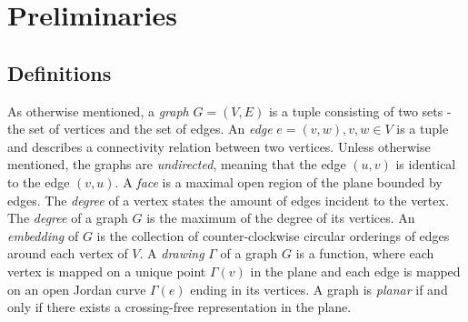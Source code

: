 \section{Preliminaries}
\subsection{Definitions}
As otherwise mentioned, a \textit{graph} $G=(V,E)$ is a tuple consisting of two sets - the set of vertices and the set of edges. An \textit{edge} $e = (v,w), v,w \in V$ is a tuple and describes a connectivity relation between two vertices. Unless otherwise mentioned, the graphs are \textit{undirected}, meaning that the edge $(u,v)$ is identical to the edge $(v,u)$. 
A \textit{face} is a maximal open region of the plane bounded by edges. 
The \textit{degree} of a vertex states the amount of edges incident to the vertex. The \textit{degree} of a graph $G$ is the maximum of the degree of its vertices. 
An \textit{embedding} of $G$ is the collection of counter-clockwise circular orderings of edges around each vertex of $V$.
A \textit{drawing} $\Gamma$ of a graph $G$ is a function, where each vertex is mapped on a unique point $\Gamma(v)$ in the plane and each edge is mapped on an open Jordan curve $\Gamma(e)$ ending in its vertices. 
A graph is \textit{planar} if and only if there exists a crossing-free representation in the plane. 
\cite[Page 100]{DBLP:books/daglib/0023376}